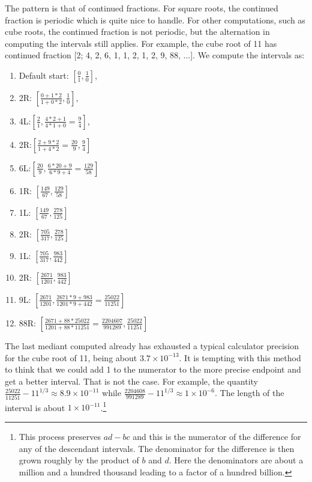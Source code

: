 \documentclass[12pt]{article}
\begin{document}
The pattern is that of continued fractions. For square roots, the continued fraction is periodic which is quite nice to handle. For other computations, such as cube roots, the continued fraction is not periodic, but the alternation in computing the intervals still applies. For example, the cube root of 11 has continued fraction [2; 4, 2, 6, 1, 1, 2, 1, 2, 9, 88, ...]. We compute the intervals as:  
\begin{enumerate}
\item Default start: $[\frac{0}{1}, \frac{1}{0}]$, 
\item 2R: $[\frac{0+1*2}{1+0*2}, \frac{1}{0}]$, 
\item 4L:$[\frac{2}{1}, \frac{4*2+1}{4*1+0} =\frac{9}{4}]$, 
\item 2R:$[\frac{2+9*2}{1+4*2} = \frac{20}{9}, \frac{9}{4}]$
\item 6L:$[\frac{20}{9}, \frac{6*20+9}{6*9 + 4} = \frac{129}{58}]$
\item 1R: $[\frac{149}{67}, \frac{129}{58}]$
\item 1L: $[\frac{149}{67}, \frac{278}{125}]$
\item 2R: $[\frac{705}{317}, \frac{278}{125}]$
\item 1L: $[\frac{705}{317}, \frac{983}{442}]$
\item 2R: $[\frac{2671}{1201}, \frac{983}{442}]$
\item 9L: $[\frac{2671}{1201}, \frac{2671*9+983}{1201*9+442} = \frac{25022}{11251}]$
\item 88R: $[\frac{2671+88*25022}{1201+88*11251} = \frac{2204607}{991289}, \frac{25022}{11251}]$
\end{enumerate}

The last mediant computed already has exhausted a typical calculator precision for the cube root of 11, being about $3.7\times 10^{-13}$. It is tempting with this method to think that we could add 1 to the numerator to the more precise endpoint and get a better interval. That is not the case. For example, the quantity $\frac{25022}{11251} - 11^{1/3} \approx 8.9\times 10^{-11}$ while $\frac{2204608}{991289} - 11^{1/3} \approx 1\times10^{-6}$. The length of the interval is about $1\times10^{-11}$.\footnote{This process preserves $ad -bc$ and this is the numerator of the difference for any of the descendant intervals. The denominator for the difference is then grown roughly by the product of $b$ and $d$. Here the denominators are about a million and a hundred thousand leading to a factor of a hundred billion.} 
\end{document}
